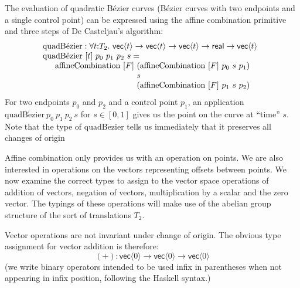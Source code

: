 \begin{example}
  The evaluation of quadratic B\'{e}zier curves (B\'{e}zier curves
  with two endpoints and a single control point) can be expressed
  using the affine combination primitive and three steps of De
  Casteljau's algorithm:
  \begin{displaymath}
    \begin{array}{@{}l}
      \mathrm{quadB\acute{e}zier} : \forall t \mathord:T_2.\ \mathsf{vec}\langle t \rangle \to \mathsf{vec}\langle t \rangle \to \mathsf{vec}\langle t \rangle \to \mathsf{real} \to \mathsf{vec}\langle t \rangle \\
      \mathrm{quadB\acute{e}zier}\ [t]\ p_0\ p_1\ p_2\ s = \\
      \quad
      \begin{array}{l@{\hspace{-0.002cm}}l}
        \mathrm{affineCombination}\ [F]\ & (\mathrm{affineCombination}\ [F]\ p_0\ s\ p_1) \\
        & s \\
        & (\mathrm{affineCombination}\ [F]\ p_1\ s\ p_2)
      \end{array}
    \end{array}
  \end{displaymath}
  For two endpoints $p_0$ and $p_2$ and a control point $p_1$, an
  application $\mathrm{quadB\acute{e}zier}\ p_0\ p_1\ p_2\ s$ for $s
  \in [0,1]$ gives us the point on the curve at ``time'' $s$. Note
  that the type of $\mathrm{quadB\acute{e}zier}$ tells us immediately
  that it preserves all changes of origin
\end{example}

Affine combination only provides us with an operation on points. We
are also interested in operations on the vectors representing offsets
between points. We now examine the correct types to assign to the
vector space operations of addition of vectors, negation of vectors,
multiplication by a scalar and the zero vector. The typings of these
operations will make use of the abelian group structure of the sort of
translations $T_2$.

Vector operations are not invariant under change of origin. The
obvious type assignment for vector addition is therefore:
\begin{displaymath}
  (+) : \mathsf{vec}\langle 0 \rangle \to \mathsf{vec}\langle 0 \rangle \to \mathsf{vec}\langle 0 \rangle
\end{displaymath}
(we write binary operators intended to be used infix in parentheses
when not appearing in infix position, following the Haskell
syntax.)

